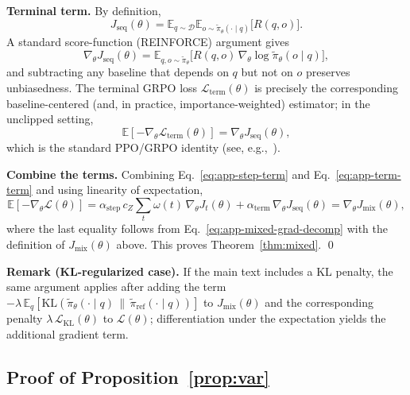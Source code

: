 \documentclass{article}
\theoremstyle{plain}
\theoremstyle{definition}
\theoremstyle{remark}
\begin{document}
\textbf{Terminal term.}
By definition,
\[
  J_{\text{seq}}(\theta)
  =
  \mathbb{E}_{q\sim\mathcal{D}}
  \mathbb{E}_{o\sim\tilde{\pi}_\theta(\cdot\mid q)}
  \bigl[R(q,o)\bigr].
\]
A standard score-function (REINFORCE) argument gives
\[
  \nabla_\theta J_{\text{seq}}(\theta)
  =
  \mathbb{E}_{q,o\sim\tilde{\pi}_\theta}
  \bigl[
    R(q,o)\,\nabla_\theta \log \tilde{\pi}_\theta(o\mid q)
  \bigr],
\]
and subtracting any baseline that depends on $q$ but not on $o$ preserves unbiasedness.
The terminal GRPO loss $\mathcal{L}_{\text{term}}(\theta)$ is precisely the corresponding baseline-centered (and, in practice, importance-weighted) estimator; in the unclipped setting,
\begin{equation}
  \mathbb{E}\!\left[-\nabla_\theta \mathcal{L}_{\text{term}}(\theta)\right]
  =
  \nabla_\theta J_{\text{seq}}(\theta),
  \label{eq:app-term-term}
\end{equation}
which is the standard PPO/GRPO identity (see, e.g.,~\citet{shao2024deepseekmath}).

\textbf{Combine the terms.}
Combining Eq.~\ref{eq:app-step-term} and Eq.~\ref{eq:app-term-term} and using linearity of expectation,
\[
\mathbb{E}\!\left[-\nabla_\theta \mathcal{L}(\theta)\right]
=
\alpha_{\text{step}}\,c_Z \sum_t \omega(t)\,\nabla_\theta J_t(\theta)
+
\alpha_{\text{term}}\,\nabla_\theta J_{\text{seq}}(\theta)
=
\nabla_\theta J_{\text{mix}}(\theta),
\]
where the last equality follows from Eq.~\ref{eq:app-mixed-grad-decomp} with the definition of $J_{\text{mix}}(\theta)$ above.
This proves Theorem~\ref{thm:mixed}. \qed


\textbf{Remark (KL-regularized case).}
If the main text includes a KL penalty, the same argument applies after adding the term
$-\lambda\,\mathbb{E}_{q}[\mathrm{KL}(\tilde{\pi}_\theta(\cdot\mid q)\,\|\,\tilde{\pi}_{\text{ref}}(\cdot\mid q))]$
to $J_{\text{mix}}(\theta)$ and the corresponding penalty $\lambda\,\mathcal{L}_{\text{KL}}(\theta)$ to $\mathcal{L}(\theta)$; differentiation under the expectation yields the additional gradient term.











\subsection{Proof of Proposition~\ref{prop:var}}
\label{app:proof-partial}
\end{document}
